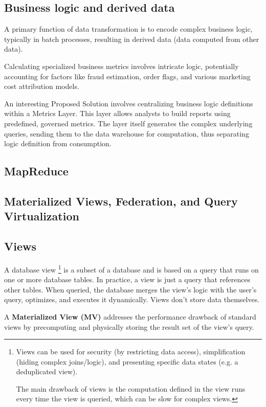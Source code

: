 \subsection*{Business logic and derived data}
A primary function of data transformation is to encode
complex business logic, typically in batch processes,
resulting in derived data (data computed from other data).

Calculating specialized business metrics involves
intricate logic, potentially accounting for factors
like fraud estimation, order flags, and various
marketing cost attribution models.

An interesting Proposed Solution involves centralizing
business logic definitions within a Metrics Layer.
This layer allows analysts to build reports using
predefined, governed metrics. The layer itself
generates the complex underlying queries, sending
them to the data warehouse for computation, thus
separating logic definition from consumption.


\subsection*{MapReduce}







\subsection*{Materialized Views, Federation, and Query Virtualization}


\subsection*{Views}
A database view
\footnote{
    Views can be used for security (by restricting data
    access), simplification (hiding complex joins/logic),
    and presenting specific data states (e.g. a 
    deduplicated view). 

    The main drawback of views is the computation defined
    in the view runs every time the view is queried,
    which can be slow for complex views.
}
is a subset of a database and is based
on a query that runs on one or more database tables.
In practice, a view is just a query that references
other tables. When queried, the database merges the
view's logic with the user's query, optimizes,
and executes it dynamically. Views don't store data
themselves. 

A \textbf{Materialized View (MV)} addresses the
performance drawback of standard views by
precomputing and physically storing the result set
of the view's query. 

